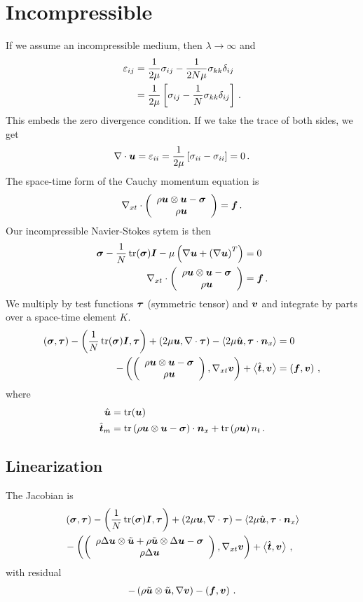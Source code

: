 \documentclass{article}
\begin{document}
\section*{Incompressible}
If we assume an incompressible medium, then $\lambda\rightarrow\infty$ and
\begin{align*}
  \varepsilon_{ij}&=\frac{1}{2\mu}\sigma_{ij}-\frac{1}{2N\mu}\sigma_{kk}\delta_{ij}\\
  &=\frac{1}{2\mu}\LRs{\sigma_{ij}-\frac{1}{N}\sigma_{kk}\delta_{ij}}\,.
\end{align*}
This embeds the zero divergence condition. If we take the trace of both sides, we get
\begin{align*}
  \Div\bfu=\varepsilon_{ii}=\frac{1}{2\mu}\LRs{\sigma_{ii}-\sigma_{ii}}=0\,.
\end{align*}
The space-time form of the Cauchy momentum equation is
\begin{equation*}
\Divxt\vecttwo{\rho\bfu\otimes\bfu-\bfsigma}{\rho\bfu}=\bff\,.
\end{equation*}
Our incompressible Navier-Stokes sytem is then
\begin{align*}
\bfsigma-\frac{1}{N}\trace(\bfsigma)\bfI-\mu\LRp{\Grad\bfu+\LRp{\Grad\bfu}^T}&=0\\
\Divxt\vecttwo{\rho\bfu\otimes\bfu-\bfsigma}{\rho\bfu}&=\bff\,.
\end{align*}
We multiply by test functions $\bftau$ (symmetric tensor) and $\bfv$ and integrate by parts over a space-time element $K$.
\begin{align*}
\LRp{\bfsigma,\bftau}-\LRp{\frac{1}{N}\trace(\bfsigma)\bfI,\bftau}+\LRp{2\mu\bfu,\Div\bftau}-\LRa{2\mu\hat\bfu,\bftau\cdot\bfn_x}&=0\\
-\LRp{\vecttwo{\rho\bfu\otimes\bfu-\bfsigma}{\rho\bfu},\Gradxt\bfv}+\LRa{\hat\bft,\bfv}&=\LRp{\bff,\bfv}\,,
\end{align*}
where 
\begin{equation*}
\begin{aligned}
\hat\bfu&=\trace(\bfu)\\
\hat\bft_m&=\trace\LRp{\rho\bfu\otimes\bfu-\bfsigma}\cdot\bfn_x
+\trace\LRp{\rho\bfu} n_t\,.
\end{aligned}
\end{equation*}

\subsection*{Linearization}
The Jacobian is
\begin{align*}
&\LRp{\bfsigma,\bftau}-\LRp{\frac{1}{N}\trace(\bfsigma)\bfI,\bftau}+\LRp{2\mu\bfu,\Div\bftau}-\LRa{2\mu\hat\bfu,\bftau\cdot\bfn_x}\\
&-\LRp{\vecttwo{\rho\Delta\bfu\otimes\tilde\bfu+\rho\tilde\bfu\otimes\Delta\bfu-\bfsigma}{\rho\Delta\bfu},\Gradxt\bfv}+\LRa{\hat\bft,\bfv}\,,
\end{align*}
with residual
\begin{align*}
-\LRp{\rho\tilde\bfu\otimes\tilde\bfu,\Grad\bfv}-\LRp{\bff,\bfv}\,.
\end{align*}
\end{document}
